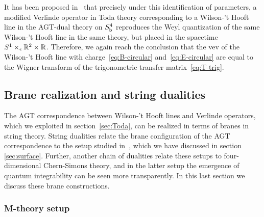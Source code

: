 It has been proposed in~\cite{Ito:2011ea} that precisely under this
identification of parameters, a modified Verlinde operator in Toda
theory corresponding to a Wilson-'t Hooft line in the AGT-dual theory
on $S^4_{\mathsf{b}}$ reproduces the Weyl quantization of the same Wilson-'t
Hooft line in the same theory, but placed in the spacetime
$S^1 \times_\epsilon \mathbb{R}^2 \times \mathbb{R}$.  Therefore, we again reach the
conclusion that the vev of the Wilson-'t Hooft line with
charge~\eqref{eq:B-circular} and~\eqref{eq:E-circular} are equal to
the Wigner transform of the trigonometric transfer
matrix~\eqref{eq:T-trig}.









\subsection{Brane realization and string dualities}
\label{sec:branes}

The AGT correspondence between Wilson-'t Hooft lines and Verlinde
operators, which we exploited in section~\ref{sec:Toda}, can be
realized in terms of branes in string theory.
String dualities relate the brane configuration of the AGT correspondence
to the setup studied in~\cite{Maruyoshi:2016caf, Yagi:2017hmj}, which
we have discussed in section \ref{sec:surface}.
Further, another chain of dualities relate these setups to four-dimensional Chern-Simons theory,
and in the latter setup the emergence of quantum integrability can be seen more transparently.
In this last
section we discuss these brane constructions.







\subsubsection{M-theory setup} %

